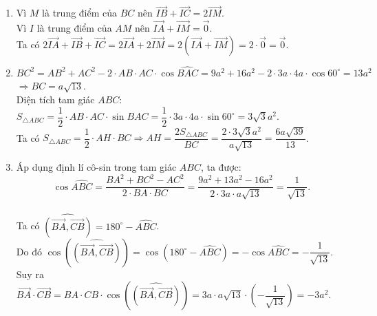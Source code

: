 \begin{bt}
{\begin{center}
		\end{center}
		\begin{enumerate}
		\item
		Vì $M$ là trung điểm của $BC$ nên $\overrightarrow{IB} + \overrightarrow{IC} =2\overrightarrow{IM}$.\\
		Vì $I$ là trung điểm của $AM$ nên $\overrightarrow{IA} +\overrightarrow{IM}=\overrightarrow{0}$.\\
		Ta có 
		 $2\overrightarrow{IA}+\overrightarrow{IB}+\overrightarrow{IC}=2\overrightarrow{IA} + 2\overrightarrow{IM} = 2 \left( \overrightarrow{IA} + \overrightarrow{IM} \right) =2\cdot\overrightarrow{0}= \overrightarrow{0} $.
		\item $BC^2=AB^2 +AC^2 -2\cdot AB\cdot AC\cdot \cos{\widehat{BAC}}=9a^2 +16a^2 -2\cdot 3a\cdot 4a\cdot \cos{60^\circ}=13a^2$\\
		$ \Rightarrow BC= a\sqrt{13}$. \\
		Diện tích tam giác $ABC$: $S_{\triangle ABC}= \dfrac{1}{2}\cdot AB\cdot AC\cdot \sin{\widehat{BAC}}=\dfrac{1}{2}\cdot 3a\cdot 4a\cdot \sin{60^\circ}=3\sqrt{3}a^2$. \\
		Ta có $S_{\triangle ABC}= \dfrac{1}{2}\cdot AH\cdot BC \Rightarrow AH=\dfrac{2S_{\triangle ABC}}{BC}=\dfrac{2\cdot 3\sqrt{3}a^2}{a\sqrt{13}
		}=\dfrac{6a\sqrt{39}}{13}$.
		\item 
		Áp dụng định lí cô-sin trong tam giác $ABC$, ta được:
		$$\cos \widehat{ABC} =\dfrac{BA^2 +BC^2 -AC^2}{2\cdot BA\cdot BC} =\dfrac{9a^2 +13a^2-16a^2}{2\cdot 3a\cdot a\sqrt{13}}=\dfrac{1}{\sqrt{13}}.$$\\
		Ta có $\widehat{\left( \overrightarrow{BA}, \overrightarrow{CB} \right)} =180^\circ -\widehat{ABC}$.\\
		Do đó $\cos{\left( \widehat{\left( \overrightarrow{BA}, \overrightarrow{CB} \right)}\right)}=\cos{\left(  180^\circ -\widehat{ABC}\right)}=-\cos{\widehat{ABC}}=-\dfrac{1}{\sqrt{13}}$.\\
		Suy ra
		$\overrightarrow{BA}\cdot\overrightarrow{CB}=BA\cdot CB\cdot  \cos{\left( \widehat{\left( \overrightarrow{BA}, \overrightarrow{CB} \right)}\right)}=3a\cdot a\sqrt{13}\cdot \left(-\dfrac{1}{\sqrt{13}}\right)=-3a^2$.
	\end{enumerate}

}
\end{bt}

